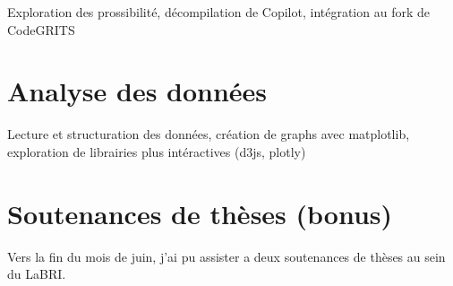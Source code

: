 Exploration des prossibilité, décompilation de Copilot, intégration au fork de CodeGRITS

\section{Analyse des données}

Lecture et structuration des données, création de graphs avec matplotlib, exploration de librairies plus intéractives (d3js, plotly)

\section{Soutenances de thèses (bonus)}

Vers la fin du mois de juin, j'ai pu assister a deux soutenances de thèses au sein du LaBRI.
